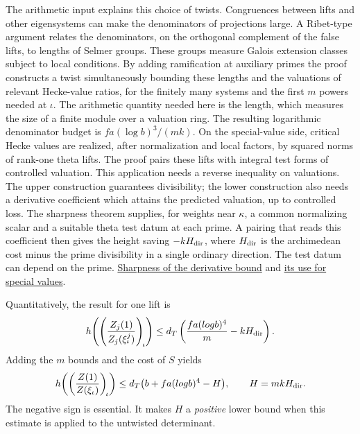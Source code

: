 \documentclass[11pt,letterpaper]{article}
\newcommand{\sref}[2]{\href{https://github.com/VladimirReshetnikov/ProveIt/blob/d8415e76ad850651f8c0083afe689dd9f4a45a10/Analysis/GeneralizedRiemannHypothesis/vendor/grh-lean/grh/src/#1.lean}{#2}}
\newcommand{\upperref}[2]{\sref{#1}{#2}}
\begin{document}
The arithmetic input explains this choice of twists. Congruences between lifts and other eigensystems can make the denominators of projections large. A Ribet-type argument relates the denominators, on the orthogonal complement of the false lifts, to lengths of Selmer groups. These groups measure Galois extension classes subject to local conditions. By adding ramification at auxiliary primes the proof constructs a twist simultaneously bounding these lengths and the valuations of relevant Hecke-value ratios, for the finitely many systems and the first $m$ powers needed at $\iota$. The arithmetic quantity needed here is the length, which measures the size of a finite module over a valuation ring. The resulting logarithmic denominator budget is $fa(\log b)^3/(mk)$. On the special-value side, critical Hecke values are realized, after normalization and local factors, by squared norms of rank-one theta lifts. The proof pairs these lifts with integral test forms of controlled valuation. This application needs a reverse inequality on valuations. The upper construction guarantees divisibility; the lower construction also needs a derivative coefficient which attains the predicted valuation, up to controlled loss. The sharpness theorem supplies, for weights near $\kappa$, a common normalizing scalar and a suitable theta test datum at each prime. A pairing that reads this coefficient then gives the height saving $-kH_{\rm dir}$, where $H_{\rm dir}$ is the archimedean cost minus the prime divisibility in a single ordinary direction. The test datum can depend on the prime. \upperref{New/Derivatives/Sharpness/BoundAttained}{Sharpness of the derivative bound} and \upperref{New/OneLift/HeckeValues/TwistedValueHeights}{its use for special values}.

Quantitatively, the result for one lift is
\[
 h\!\left(\left(\frac{Z_j(1)}{Z_j(\xi_\iota^j)}\right)_{\!\iota}\right)
       \le d_T\left(\frac{fa(\log b)^4}{m}-kH_{\rm dir}\right).
\]
Adding the $m$ bounds and the cost of $S$ yields
\[
 h\!\left(\left(\frac{Z(1)}{Z(\xi_\iota)}\right)_{\!\iota}\right)
       \le d_T\bigl(b+fa(\log b)^4-H\bigr),
       \qquad H=mkH_{\rm dir}.
\]
The negative sign is essential. It makes $H$ a \emph{positive} lower bound when this estimate is applied to the untwisted determinant.
\end{document}
